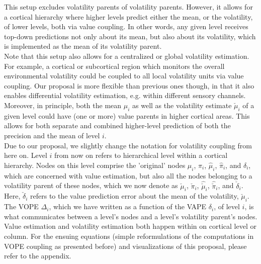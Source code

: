 This setup excludes volatility parents of volatility parents. However, it allows for a cortical hierarchy where higher levels predict either the mean, or the volatility, of lower levels, both via value coupling. In other words, any given level receives top-down predictions not only about its mean, but also about its volatility, which is implemented as the mean of its volatility parent.\\

Note that this setup also allows for a centralized or global volatility estimation. For example, a cortical or subcortical region which monitors the overall environmental volatility could be coupled to all local volatility units via value coupling. Our proposal is more flexible than previous ones \cite{Kanai2015} though, in that it also enables differential volatility estimation, e.g. within different sensory channels. \\

Moreover, in principle, both the mean $\mu_i$ as well as the volatility estimate $\check{\mu}_i$ of a given level could have (one or more) value parents in higher cortical areas. This allows for both separate and combined higher-level prediction of both the precision and the mean of level $i$.\\

Due to our proposal, we slightly change the notation for volatility coupling from here on. Level $i$ from now on refers to hierarchical level within a cortical hierarchy. Nodes on this level comprise the 'original' nodes $\mu_i$, $\pi_i$, $\hat{\mu}_i$, $\hat{\pi}_i$, and $\delta_i$, which are concerned with value estimation, but also all the nodes belonging to a volatility parent of these nodes, which we now denote as $\check{\mu}_i$, $\check{\pi}_i$, $\hat{\check{\mu}}_i$, $\hat{\check{\pi}}_i$, and $\check{\delta}_i$. Here, $\check{\delta}_i$ refers to the value prediction error about the mean of the volatility, $\check{\mu}_i$. \\

The \textsf{VOPE} $\Delta_i$, which we have written as a function of the \textsf{VAPE} $\delta_i$, of level $i$, is what communicates between a level's nodes and a level's volatility parent's nodes. Value estimation and volatility estimation both happen within on cortical level or column. For the ensuing equations (simple reformulations of the computations in \textsf{VOPE} coupling as presented before) and visualizations of this proposal, please refer to the appendix. \\

